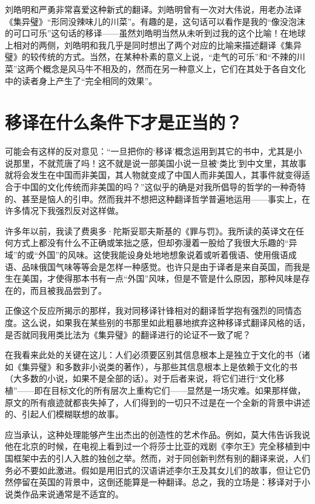 刘皓明和严勇非常喜爱这种新式的翻译。刘皓明曾有一次对大伟说，用老办法译《集异璧》“形同没辣味儿的川菜”。有趣的是，这句话可以看作是我的“像没泡沫的可口可乐”这句话的移译——虽然刘皓明当然从未听到过我的这个比喻！在地球上相对的两侧，刘皓明和我几乎是同时想出了两个对应的比喻来描述翻译《集异璧》的较传统的方式。当然，在某种朴素的意义上说，“走气的可乐”和“不辣的川菜”这两个概念是风马牛不相及的，然而在另一种意义上，它们在其处于各自文化中的读者身上产生了“完全相同的效果”。

\section{移译在什么条件下才是正当的？}

可能会有这样的反对意见：“一旦把你的‘移译’概念运用到其它的书中，尤其是小说那里，不就荒唐了吗！这不就是说一部美国小说一旦被‘类比’到中文里，其故事就将会发生在中国而非美国，其人物就变成了中国人而非美国人，其事件就变得适合于中国的文化传统而非美国的吗？”这似乎的确是对我所倡导的哲学的一种奇特的、甚至是恼人的引申。然而我并不想把这种翻译哲学普遍地运用——事实上，在许多情况下我强烈反对这样做。

许多年以前，我读了费奥多·陀斯妥耶夫斯基的《罪与罚》。我所读的英译文在任何方式上都没有什么不正确或笨拙之感，但却弥漫着一股给了我很大乐趣的“异域”的或“外国”的风味。这使我能设身处地地想象说着或听着俄语、使用俄语成语、品味俄国气味等等会是怎样一种感觉。也许只是由于译者是来自英国，而我是生在美国，才使得那本书有一点“外国”风味，但是不管是什么原因，那种风味是存在的，而且被我品尝到了。

正像这个反应所揭示的那样，我对同移译针锋相对的翻译哲学抱有强烈的同情态度。这么说，如果我在某些别的书那里如此粗暴地摈弃这种移译式翻译风格的话，是否就同我用类比法为《集异璧》的翻译进行的论证不一致了呢？

在我看来此处的关键在这儿：人们必须要区别其信息根本上是独立于文化的书（诸如《集异璧》和多数非小说类的著作），与那些其信息根本上是依赖于文化的书（大多数的小说，如果不是全部的话）。对于后者来说，将它们进行“文化移植”——即在目标文化的所有层次上重构它们——显然是一场灾难。如果那样做，原文的所有痕迹就都丧失掉了，人们得到的一切只不过是在一个全新的背景中讲述的、引起人们模糊联想的故事。

应当承认，这种处理能够产生出杰出的创造性的艺术作品。例如，莫大伟告诉我说他在北京的时候，在电视上看到过一个将莎士比亚的戏剧《李尔王》完全移植到中国框架中去的引人入胜的独创之举。然而，对于同创新判然有别的翻译来说，人们务必不要如此激进。假如是用旧式的汉语讲述李尔王及其女儿们的故事，但让它仍然停留在英国的背景中，这倒还能算是一种翻译。总之，我的立场是：移译对于小说类作品来说通常是不适宜的。

